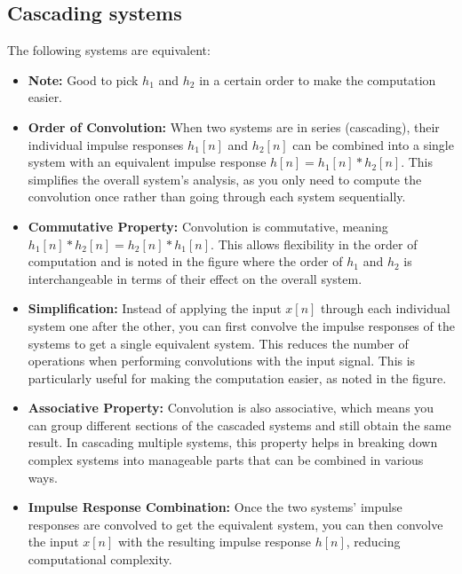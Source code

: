 \subsection{Cascading systems}
\begin{definition}
    The following systems are equivalent: 
    \begin{itemize}
        \item \textbf{Note:} Good to pick $h_1$ and $h_2$ in a certain order to make the computation easier. 
        \item \textbf{Order of Convolution:} When two systems are in series (cascading), their individual impulse responses \( h_1[n] \) and \( h_2[n] \) can be combined into a single system with an equivalent impulse response \( h[n] = h_1[n] * h_2[n] \). This simplifies the overall system's analysis, as you only need to compute the convolution once rather than going through each system sequentially.
        \item \textbf{Commutative Property:} Convolution is commutative, meaning \( h_1[n] * h_2[n] = h_2[n] * h_1[n] \). This allows flexibility in the order of computation and is noted in the figure where the order of \( h_1 \) and \( h_2 \) is interchangeable in terms of their effect on the overall system.
        \item \textbf{Simplification:} Instead of applying the input \( x[n] \) through each individual system one after the other, you can first convolve the impulse responses of the systems to get a single equivalent system. This reduces the number of operations when performing convolutions with the input signal. This is particularly useful for making the computation easier, as noted in the figure.
        \item \textbf{Associative Property:} Convolution is also associative, which means you can group different sections of the cascaded systems and still obtain the same result. In cascading multiple systems, this property helps in breaking down complex systems into manageable parts that can be combined in various ways.
        \item \textbf{Impulse Response Combination:} Once the two systems' impulse responses are convolved to get the equivalent system, you can then convolve the input \( x[n] \) with the resulting impulse response \( h[n] \), reducing computational complexity.
    \end{itemize}
\end{definition}

